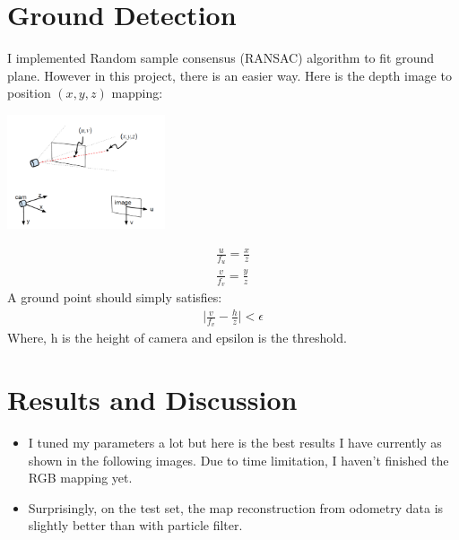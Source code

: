 \documentclass[letterpaper,twocolumn,10pt]{article}
\begin{document}
\section{Ground Detection}
I implemented Random sample consensus (RANSAC) algorithm to fit ground plane. However in this project, there is an easier way. Here is the depth image to position $(x,y,z)$ mapping:\\
\begin{center}
\includegraphics[width=0.35\textwidth]{imgs/cam}
\end{center}
\begin{align*}
\frac{u}{f_u} = \frac{x}{z} \\
\frac{v}{f_v} = \frac{y}{z}
\end{align*}
A ground point should simply satisfies:\\
\begin{align*}
\big| \frac{v}{f_v} - \frac{h}{z}\big| < \epsilon
\end{align*}
Where, h is the height of camera and epsilon is the threshold.
\section{Results and Discussion}

\begin{itemize}
\item I tuned my parameters a lot but here is the best results I have currently as shown in the following images. Due to time limitation, I haven't finished the RGB mapping yet.
\item Surprisingly, on the test set, the map reconstruction from odometry data is slightly better than with particle filter. 
\end{itemize}
\end{document}
